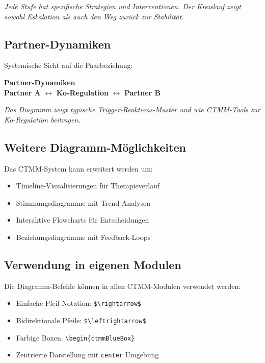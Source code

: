 \textit{Jede Stufe hat spezifische Strategien und Interventionen. Der Kreislauf zeigt sowohl Eskalation als auch den Weg zurück zur Stabilität.}

\newpage

\subsection*{\textcolor{ctmmRed}{Partner-Dynamiken}}

Systemische Sicht auf die Paarbeziehung:

\begin{center}
\begin{tcolorbox}[colback=ctmmRed!10!white,colframe=ctmmRed,width=12cm]
\centering
\textbf{Partner-Dynamiken}\\[0.5cm]
\textcolor{ctmmBlue}{\textbf{Partner A}} $\leftrightarrow$ \textcolor{ctmmGreen}{\textbf{Ko-Regulation}} $\leftrightarrow$ \textcolor{ctmmBlue}{\textbf{Partner B}}
\end{tcolorbox}
\end{center}

\textit{Das Diagramm zeigt typische Trigger-Reaktions-Muster und wie CTMM-Tools zur Ko-Regulation beitragen.}

\subsection*{\textcolor{ctmmGreen}{Weitere Diagramm-Möglichkeiten}}

\begin{ctmmGreenBox}[title=Zukünftige Erweiterungen]
Das CTMM-System kann erweitert werden um:
\begin{itemize}
  \item Timeline-Visualisierungen für Therapieverlauf
  \item Stimmungsdiagramme mit Trend-Analysen
  \item Interaktive Flowcharts für Entscheidungen
  \item Beziehungsdiagramme mit Feedback-Loops
\end{itemize}
\end{ctmmGreenBox}

\subsection*{\textcolor{ctmmBlue}{Verwendung in eigenen Modulen}}

\begin{ctmmBlueBox}[title=So nutzen Sie die Diagramme]
Die Diagramm-Befehle können in allen CTMM-Modulen verwendet werden:
\begin{itemize}
  \item Einfache Pfeil-Notation: \texttt{\$\textbackslash rightarrow\$}
  \item Bidirektionale Pfeile: \texttt{\$\textbackslash leftrightarrow\$}
  \item Farbige Boxen: \texttt{\textbackslash begin\{ctmmBlueBox\}}
  \item Zentrierte Darstellung mit \texttt{center} Umgebung
\end{itemize}
\end{ctmmBlueBox}

